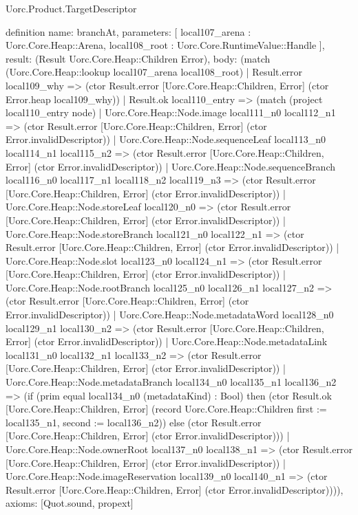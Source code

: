 \begin{lexlean}{Uorc.Product.TargetDescriptor}
\begin{semanticmodule}
definition{
  name: branchAt,
  parameters: [
    local107_arena : Uorc.Core.Heap::Arena,
    local108_root : Uorc.Core.RuntimeValue::Handle
  ],
  result: (Result Uorc.Core.Heap::Children Error),
  body: (match (Uorc.Core.Heap::lookup local107_arena local108_root)
    | Result.error local109_why => (ctor Result.error [Uorc.Core.Heap::Children, Error] (ctor Error.heap local109_why))
    | Result.ok local110_entry => (match (project local110_entry node)
      | Uorc.Core.Heap::Node.image local111_n0 local112_n1 => (ctor Result.error [Uorc.Core.Heap::Children, Error] (ctor Error.invalidDescriptor))
      | Uorc.Core.Heap::Node.sequenceLeaf local113_n0 local114_n1 local115_n2 => (ctor Result.error [Uorc.Core.Heap::Children, Error] (ctor Error.invalidDescriptor))
      | Uorc.Core.Heap::Node.sequenceBranch local116_n0 local117_n1 local118_n2 local119_n3 => (ctor Result.error [Uorc.Core.Heap::Children, Error] (ctor Error.invalidDescriptor))
      | Uorc.Core.Heap::Node.storeLeaf local120_n0 => (ctor Result.error [Uorc.Core.Heap::Children, Error] (ctor Error.invalidDescriptor))
      | Uorc.Core.Heap::Node.storeBranch local121_n0 local122_n1 => (ctor Result.error [Uorc.Core.Heap::Children, Error] (ctor Error.invalidDescriptor))
      | Uorc.Core.Heap::Node.slot local123_n0 local124_n1 => (ctor Result.error [Uorc.Core.Heap::Children, Error] (ctor Error.invalidDescriptor))
      | Uorc.Core.Heap::Node.rootBranch local125_n0 local126_n1 local127_n2 => (ctor Result.error [Uorc.Core.Heap::Children, Error] (ctor Error.invalidDescriptor))
      | Uorc.Core.Heap::Node.metadataWord local128_n0 local129_n1 local130_n2 => (ctor Result.error [Uorc.Core.Heap::Children, Error] (ctor Error.invalidDescriptor))
      | Uorc.Core.Heap::Node.metadataLink local131_n0 local132_n1 local133_n2 => (ctor Result.error [Uorc.Core.Heap::Children, Error] (ctor Error.invalidDescriptor))
      | Uorc.Core.Heap::Node.metadataBranch local134_n0 local135_n1 local136_n2 => (if (prim equal local134_n0 (metadataKind) : Bool) then (ctor Result.ok [Uorc.Core.Heap::Children, Error] (record Uorc.Core.Heap::Children {first := local135_n1, second := local136_n2})) else (ctor Result.error [Uorc.Core.Heap::Children, Error] (ctor Error.invalidDescriptor)))
      | Uorc.Core.Heap::Node.ownerRoot local137_n0 local138_n1 => (ctor Result.error [Uorc.Core.Heap::Children, Error] (ctor Error.invalidDescriptor))
      | Uorc.Core.Heap::Node.imageReservation local139_n0 local140_n1 => (ctor Result.error [Uorc.Core.Heap::Children, Error] (ctor Error.invalidDescriptor)))),
  axioms: [Quot.sound, propext]
}


\end{semanticmodule}
\end{lexlean}
